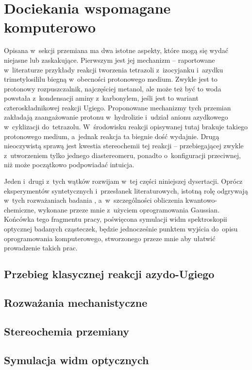 \chapter{Dociekania wspomagane komputerowo}\label{chapter:numeric}

Opisana w~sekcji  przemiana ma dwa istotne aspekty, które mogą
  się wydać niejasne lub zaskakujące.
Pierwszym jest jej mechanizm \--- raportowane w~literaturze przykłady reakcji tworzenia tetrazoli
  z~izocyjanku i~azydku trimetylosililu biegną w~obecności protonowego medium.
Zwykle jest to protonowy rozpuszczalnik, najczęściej metanol, ale może też być to woda powstała
  z~kondensacji aminy z~karbonylem, jeśli jest to wariant czteroskładnikowej reakcji Ugiego.
Proponowane mechanizmy tych przemian zakładają zaangażowanie protonu w~hydrolizie 
  i~udział anionu azydkowego w~cyklizacji do~tetrazolu.
W~środowisku reakcji opisywanej tutaj brakuje takiego protonowego medium, a~jednak reakcja
  ta biegnie dość wydajnie.
Drugą nieoczywistą sprawą jest kwestia stereochemii tej reakcji \--- przebiegającej zwykle
  z~utworzeniem tylko jednego diastereomeru, ponadto o~konfiguracji przeciwnej, niż może
  początkowo podpowiadać intuicja.

Jeden i~drugi z~tych wątków rozwijam w~tej części niniejszej dysertacji.
Oprócz eksperymentów syntetycznych i~przesłanek literaturowych, istotną rolę odgrywają w~tych
  rozważaniach badania , a~w~szczególności obliczenia kwantowo-chemiczne,
  wykonane przeze mnie z~użyciem oprogramowania Gaussian.
Końcówka tego fragmentu pracy, poświęcona symulacji widm spektroskopii optycznej badanych
  cząsteczek, będzie jednocześnie punktem wyjścia do~opisu oprogramowania komputerowego,
  stworzonego przeze mnie aby ułatwić prowadzenie takich prac.

\section{Przebieg klasycznej reakcji azydo-Ugiego}\label{numeric:classical}
\section{Rozważania mechanistyczne}\label{numeric:mechanism}
\section{Stereochemia przemiany}\label{numeric:stereo}
\section{Symulacja widm optycznych}\label{numeric:spectra}

